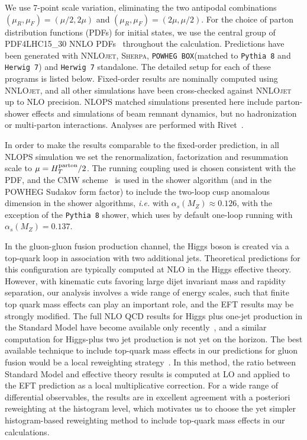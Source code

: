\documentclass[10pt,prd,fleqn,superscriptaddress,notitlepage,nofootinbib,preprintnumbers,nobalancelastpage]{revtex4-1}
\newcommand{\NNLOJET}{\textsc{NNLOjet}\xspace}
\newcommand{\PWG}{\texttt{POWHEG BOX}\xspace}
\newcommand{\PY}{\texttt{Pythia 8}\xspace}
\newcommand{\HW}{\texttt{Herwig 7}\xspace}
\newcommand{\Sherpa}{\textsc{Sherpa}\xspace}
\begin{document}
We use 7-point scale variation, eliminating the two antipodal combinations $(\mu_R,\mu_F)=(\mu/2,2\mu)$ and $(\mu_R,\mu_F)=(2\mu,\mu/2)$. For the choice of parton distribution functions (PDFs) for initial states, we use the central group of PDF4LHC15\_30 NNLO PDFs~\cite{Butterworth:2015oua} throughout the calculation.
Predictions have been generated with \NNLOJET, \Sherpa, \PWG (matched to \PY and \HW) and \HW standalone. The detailed setup for each of these programs is listed below. Fixed-order results are nominally computed using \NNLOJET, and all other simulations have been cross-checked against \NNLOJET up to NLO precision.
NLOPS matched simulations presented here include parton-shower effects and simulations of beam remnant dynamics, but no hadronization or multi-parton interactions.
Analyses are performed with Rivet~\cite{Buckley:2010ar,Bierlich:2019rhm}.

In order to make the results comparable to the fixed-order prediction, in all NLOPS simulation we set the renormalization, factorization and resummation scale to $\mu=H_T^{\rm parton}/2$.
The running coupling used is chosen consistent with the PDF, and 
the CMW scheme~\cite{Catani:1990rr} is used in the shower algorithm (and in the POWHEG Sudakov form factor) to include the two-loop cusp anomalous dimension in the shower algorithms, \emph{i.e.} with $\alpha_s(M_Z)\approx0.126$, with the exception of the \PY shower, which uses by default one-loop running with $\alpha_s(M_Z)=0.137$.

In the gluon-gluon fusion production channel, the Higgs boson is created via a top-quark loop in association with two additional jets. Theoretical predictions for this configuration are typically computed at NLO in the Higgs effective theory. However, with kinematic cuts favoring large dijet invariant mass and rapidity separation, our analysis involves a wide range of energy scales, such that finite top quark mass effects can play an important role, and the EFT results may be strongly modified. The full NLO QCD results for Higgs plus one-jet production in the Standard Model have become available only recently~\cite{Lindert:2018iug,Jones:2018hbb}, and a similar computation for Higgs-plus two jet production is not yet on the horizon. The best available technique to include top-quark mass effects in our predictions for gluon fusion would be a local reweighting strategy~\cite{Buschmann:2014sia,Greiner:2016awe,NNLOJETSecDec}. In this method, the ratio between Standard Model and effective theory results is computed at LO and applied to the EFT prediction as a local multiplicative correction. For a wide range of differential observables, the results are in excellent agreement with a posteriori reweighting at the histogram level, which motivates us to choose the yet simpler histogram-based reweighting method to include top-quark mass effects in our calculations.
\end{document}
